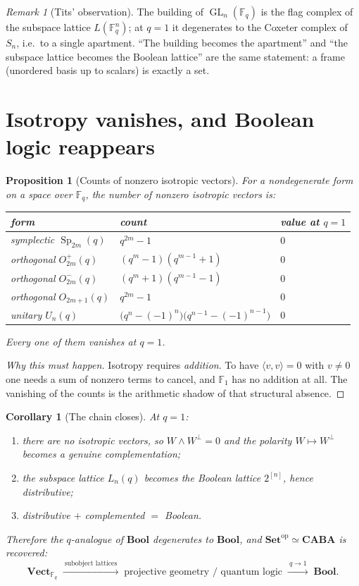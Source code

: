 \documentclass[11pt,a4paper]{article}
\newtheorem{proposition}[theorem]{Proposition}
\newtheorem{corollary}[theorem]{Corollary}
\theoremstyle{definition}
\theoremstyle{remark}
\newtheorem{remark}[theorem]{Remark}
\newcommand{\FF}{\mathbb{F}}
\newcommand{\ip}[2]{\langle #1, #2 \rangle}
\newcommand{\perpp}{^{\perp}}
\newcommand{\cat}[1]{\mathbf{#1}}
\newcommand{\Set}{\cat{Set}}
\newcommand{\Bool}{\cat{Bool}}
\newcommand{\CABA}{\cat{CABA}}
\newcommand{\Vect}{\cat{Vect}}
\newcommand{\op}{\mathrm{op}}
\DeclareMathOperator{\GL}{GL}
\DeclareMathOperator{\Sp}{Sp}
\begin{document}
\begin{remark}[Tits' observation]
The building of $\GL_n(\FF_q)$ is the flag complex of the subspace lattice $L(\FF_q^{n})$; at
$q=1$ it degenerates to the Coxeter complex of $S_n$, i.e.\ to a single apartment. ``The
building becomes the apartment'' and ``the subspace lattice becomes the Boolean lattice'' are
the same statement: a frame (unordered basis up to scalars) is exactly a set.
\end{remark}

\section{Isotropy vanishes, and Boolean logic reappears}

\begin{proposition}[Counts of nonzero isotropic vectors]\label{prop:isocount}
For a nondegenerate form on a space over $\FF_q$, the number of nonzero isotropic vectors is:
\begin{center}
\begin{tabular}{lll}
\toprule
form & count & value at $q=1$ \\
\midrule
symplectic $\Sp_{2m}(q)$ & $q^{2m}-1$ & $0$ \\
orthogonal $O_{2m}^{+}(q)$ & $(q^{m}-1)(q^{m-1}+1)$ & $0$ \\
orthogonal $O_{2m}^{-}(q)$ & $(q^{m}+1)(q^{m-1}-1)$ & $0$ \\
orthogonal $O_{2m+1}(q)$ & $q^{2m}-1$ & $0$ \\
unitary $U_{n}(q)$ & $\bigl(q^{n}-(-1)^{n}\bigr)\bigl(q^{n-1}-(-1)^{n-1}\bigr)$ & $0$ \\
\bottomrule
\end{tabular}
\end{center}
Every one of them vanishes at $q = 1$.
\end{proposition}

\begin{proof}[Why this must happen]
Isotropy requires \emph{addition}. To have $\ip{v}{v} = 0$ with $v \neq 0$ one needs a sum of
nonzero terms to cancel, and $\FF_1$ has no addition at all. The vanishing of the counts is
the arithmetic shadow of that structural absence.
\end{proof}

\begin{corollary}[The chain closes]
At $q = 1$:
\begin{enumerate}[nosep,label=(\alph*)]
  \item there are no isotropic vectors, so $W \wedge W\perpp = 0$ and the polarity
        $W \mapsto W\perpp$ becomes a genuine complementation;
  \item the subspace lattice $L_n(q)$ becomes the Boolean lattice $2^{[n]}$, hence
        distributive;
  \item distributive $+$ complemented $=$ Boolean.
\end{enumerate}
Therefore the $q$-analogue of $\Bool$ degenerates to $\Bool$, and
$\Set^{\op} \simeq \CABA$ is recovered:
\[
  \Vect_{\FF_q} \;\xrightarrow{\ \text{subobject lattices}\ }\;
  \text{projective geometry / quantum logic} \;\xrightarrow{\ q \to 1\ }\; \Bool .
\]
\end{corollary}
\end{document}
